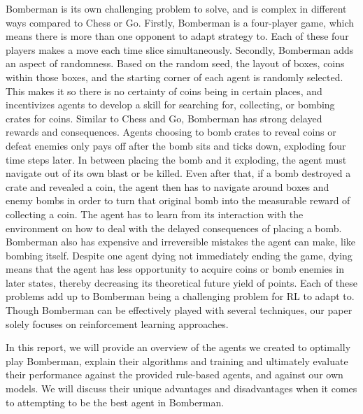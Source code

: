 \documentclass[article, 10pt]{IEEEtran}
\begin{document}
Bomberman is its own challenging problem to solve, and is complex in different ways compared to Chess or Go. Firstly, Bomberman is a four-player game, which means there is more than one opponent to adapt strategy to. Each of these four players makes a move each time slice simultaneously. Secondly, Bomberman adds an aspect of randomness. Based on the random seed, the layout of boxes, coins within those boxes, and the starting corner of each agent is randomly selected. This makes it so there is no certainty of coins being in certain places, and incentivizes agents to develop a skill for searching for, collecting, or bombing crates for coins. Similar to Chess and Go, Bomberman has strong delayed rewards and consequences. Agents choosing to bomb crates to reveal coins or defeat enemies only pays off after the bomb sits and ticks down, exploding four time steps later. In between placing the bomb and it exploding, the agent must navigate out of its own blast or be killed. Even after that, if a bomb destroyed a crate and revealed a coin, the agent then has to navigate around boxes and enemy bombs in order to turn that original bomb into the measurable reward of collecting a coin. The agent has to learn from its interaction with the environment on how to deal with the delayed consequences of placing a bomb. Bomberman also has expensive and irreversible mistakes the agent can make, like bombing itself. Despite one agent dying not immediately ending the game, dying means that the agent has less opportunity to acquire coins or bomb enemies in later states, thereby decreasing its theoretical future yield of points. Each of these problems add up to Bomberman being a challenging problem for RL to adapt to. Though Bomberman can be effectively played with several techniques, our paper solely focuses on reinforcement learning approaches. 

In this report, we will provide an overview of the agents we created to optimally play Bomberman, explain their algorithms and training and ultimately evaluate their performance against the provided rule-based agents, and against our own models. We will discuss their unique advantages and disadvantages when it comes to attempting to be the best agent in Bomberman.


\end{document}
